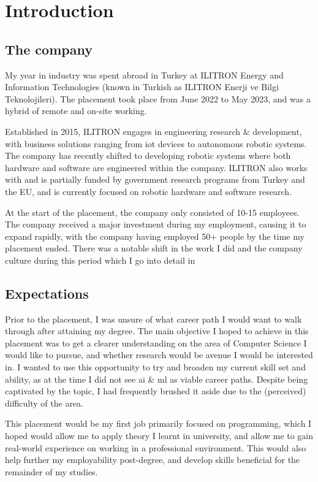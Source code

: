 \chapter{Introduction}

\section{The company}

My year in industry was spent abroad in Turkey at ILITRON Energy and Information Technologies
(known in Turkish as ILITRON Enerji ve Bilgi Teknolojileri).
The placement took place from June 2022 to May 2023, and was a hybrid of remote and on-site working.

Established in 2015, ILITRON engages in engineering research \& development,
with business solutions ranging from \gls*{iot} devices to autonomous robotic systems.
The company has recently shifted to developing robotic systems where
both hardware and software are engineered within the company.
ILITRON also works with and is partially funded by government research programs
from Turkey and the EU, and is currently focused on robotic hardware and software research.

At the start of the placement, the company only consisted of 10-15 employees.
The company received a major investment during my employment, causing it to expand rapidly,
with the company having employed 50+ people by the time my placement ended.
There was a notable shift in the work I did and the company culture during this period
which I go into detail in %

\section{Expectations}

Prior to the placement, I was unsure of what career path I would want to walk through
after attaining my degree. The main objective I hoped to achieve in this placement was
to get a clearer understanding on the area of Computer Science I would like to pursue,
and whether research would be avenue I would be interested in.
I wanted to use this opportunity to try and broaden my current skill set and ability,
as at the time I did not see \gls*{ai} \& \gls*{ml} as viable career paths.
Despite being captivated by the topic, I had frequently brushed it aside due to
the (perceived) difficulty of the area.

This placement would be my first job primarily focused on programming,
which I hoped would allow me to apply theory I learnt in university,
and allow me to gain real-world experience on working in a professional environment.
This would also help further my employability post-degree,
and develop skills beneficial for the remainder of my studies.

